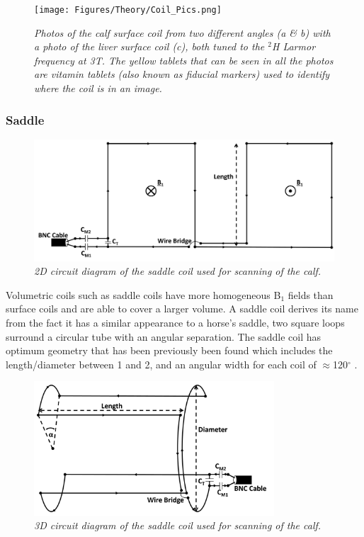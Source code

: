\begin{figure}
    \centering
    \texttt{[image: Figures/Theory/Coil\_Pics.png]}
    \caption{\textit{Photos of the calf surface coil from two different angles (a \& b) with a photo of the liver surface coil (c), both tuned to the $^2$H Larmor frequency at 3T. The yellow tablets that can be seen in all the photos are vitamin tablets (also known as fiducial markers) used to identify where the coil is in an image.}}
    \label{fig:theory:Pics}
\end{figure}

\subsubsection{Saddle}

\begin{figure}
    \centering
    \includegraphics[width=1\textwidth]{Figures/Theory/Planar_Saddle.png}
    \caption{\textit{2D circuit diagram of the saddle coil used for scanning of the calf.}}
    \label{fig:theory:2D_Saddle}
\end{figure}

Volumetric coils such as saddle coils have more homogeneous B$_1$ fields than surface coils and are able to cover a larger volume. A saddle coil derives its name from the fact it has a similar appearance to a horse's saddle, two square loops surround a circular tube with an angular separation. The saddle coil has optimum geometry that has been previously been found which includes the length/diameter between 1 and 2, and an angular width for each coil of $\approx$120$^\circ$ \cite{Ginsberg1970OptimumField,Salmon2006OptimizationImaging}.

\begin{figure}
    \centering
    \includegraphics[width=0.8\textwidth]{Figures/Theory/3D_Saddle.png}
    \caption{\textit{3D circuit diagram of the saddle coil used for scanning of the calf.}}
    \label{fig:theory:3D_Saddle}
\end{figure}

